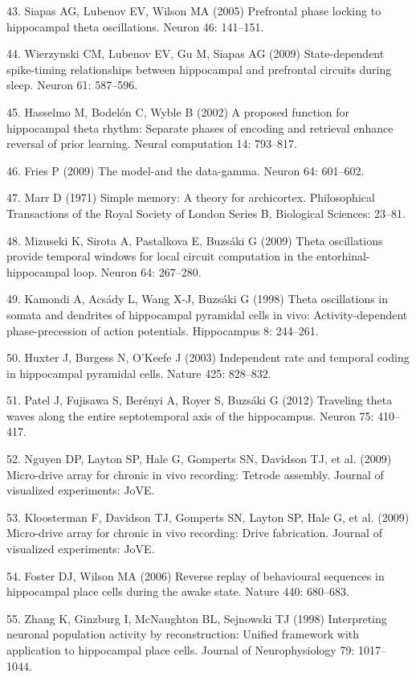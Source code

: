 \documentclass[]{article}
\begin{document}
43. Siapas AG, Lubenov EV, Wilson MA (2005) Prefrontal phase locking to
hippocampal theta oscillations. Neuron 46: 141--151.

44. Wierzynski CM, Lubenov EV, Gu M, Siapas AG (2009) State-dependent
spike-timing relationships between hippocampal and prefrontal circuits
during sleep. Neuron 61: 587--596.

45. Hasselmo M, Bodel{ó}n C, Wyble B (2002) A proposed function for
hippocampal theta rhythm: Separate phases of encoding and retrieval
enhance reversal of prior learning. Neural computation 14: 793--817.

46. Fries P (2009) The model-and the data-gamma. Neuron 64: 601--602.

47. Marr D (1971) Simple memory: A theory for archicortex. Philosophical
Transactions of the Royal Society of London Series B, Biological
Sciences: 23--81.

48. Mizuseki K, Sirota A, Pastalkova E, Buzs{á}ki G (2009) Theta
oscillations provide temporal windows for local circuit computation in
the entorhinal-hippocampal loop. Neuron 64: 267--280.

49. Kamondi A, Acs{á}dy L, Wang X-J, Buzs{á}ki G (1998) Theta
oscillations in somata and dendrites of hippocampal pyramidal cells in
vivo: Activity-dependent phase-precession of action potentials.
Hippocampus 8: 244--261.

50. Huxter J, Burgess N, O'Keefe J (2003) Independent rate and temporal
coding in hippocampal pyramidal cells. Nature 425: 828--832.

51. Patel J, Fujisawa S, Ber{é}nyi A, Royer S, Buzs{á}ki G (2012)
Traveling theta waves along the entire septotemporal axis of the
hippocampus. Neuron 75: 410--417.

52. Nguyen DP, Layton SP, Hale G, Gomperts SN, Davidson TJ, et al.
(2009) Micro-drive array for chronic in vivo recording: Tetrode
assembly. Journal of visualized experiments: JoVE.

53. Kloosterman F, Davidson TJ, Gomperts SN, Layton SP, Hale G, et al.
(2009) Micro-drive array for chronic in vivo recording: Drive
fabrication. Journal of visualized experiments: JoVE.

54. Foster DJ, Wilson MA (2006) Reverse replay of behavioural sequences
in hippocampal place cells during the awake state. Nature 440: 680--683.

55. Zhang K, Ginzburg I, McNaughton BL, Sejnowski TJ (1998) Interpreting
neuronal population activity by reconstruction: Unified framework with
application to hippocampal place cells. Journal of Neurophysiology 79:
1017--1044.
\end{document}
